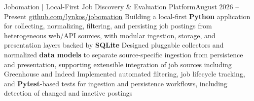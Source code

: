 
\subheading
    {Jobomation | Local-First Job Discovery \& Evaluation Platform}{August 2026 -- Present}
    {\href{https://github.com/lynkos/jobomation}{github.com/lynkos/jobomation}}{}
    \itemListStart
        \listItem{}
            {Building a local-first \textbf{Python} application for collecting, normalizing, filtering, and persisting job postings from heterogeneous web/API sources, with modular ingestion, storage, and presentation layers backed by \textbf{SQLite}}
        \listItem{}
            {Designed pluggable collectors and normalized \textbf{data models} to separate source-specific ingestion from persistence and presentation, supporting extensible integration of job sources including Greenhouse and Indeed}
        \listItem{}
            {Implemented automated filtering, job lifecycle tracking, and \textbf{Pytest}-based tests for ingestion and persistence workflows, including detection of changed and inactive postings}
    \itemListEnd